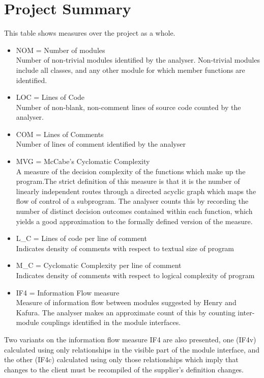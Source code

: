 \section{Project Summary}
 This table shows measures over the project as a whole. \begin{itemize}
\item NOM = Number of modules\\ 
 Number of non-trivial modules identified by the analyser. Non-trivial modules include all classes, and any other module for which member
functions are identified. 
\item LOC = Lines of Code\\ 
 Number of non-blank, non-comment lines of source code counted by the analyser. 
\item COM = Lines of Comments\\ 
 Number of lines of comment identified by the analyser 
\item MVG = McCabe's Cyclomatic Complexity\\ 
 A measure of the decision complexity of the functions which make up the program.The strict definition of this measure is that it is the
number of linearly independent routes through a directed acyclic graph which maps the flow of control of a subprogram. The analyser counts
this by recording the number of distinct decision outcomes contained within each function, which yields a good approximation to the formally
defined version of the measure. 
\item L\_C = Lines of code per line of comment\\ 
 Indicates density of comments with respect to textual size of program 
\item M\_C = Cyclomatic Complexity per line of comment\\ 
 Indicates density of comments with respect to logical complexity of program 
\item IF4 = Information Flow measure\\ 
 Measure of information flow between modules suggested by Henry and Kafura. The analyser makes an approximate count of this by counting
inter-module couplings identified in the module interfaces. 

\end{itemize}
 Two variants on the information flow measure IF4 are also presented, one (IF4v) calculated using only relationships in the visible part of
the module interface, and the other (IF4c) calculated using only those relationships which imply that changes to the client must be
recompiled of the supplier's definition changes. 

